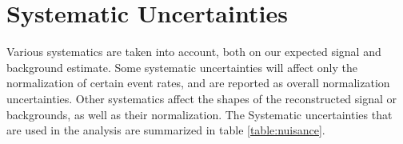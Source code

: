 \clearpage
\newpage
\section{Systematic Uncertainties}
\label{sec:systematics}
Various systematics are taken into account, both 
on our expected signal and background estimate. Some systematic uncertainties will affect only the normalization of certain event rates, 
and are reported as overall normalization uncertainties. Other systematics affect the shapes of the reconstructed signal or backgrounds, as well as their normalization.  The
Systematic uncertainties that are used in the analysis are summarized in table \ref{table:nuisance}.%


